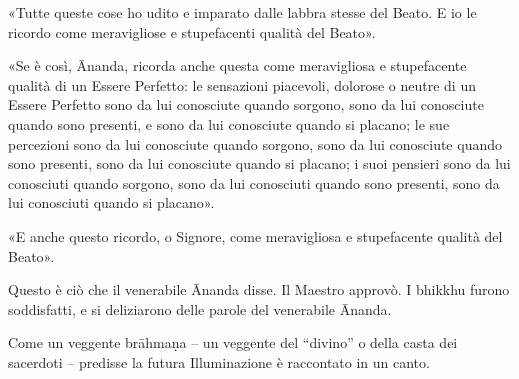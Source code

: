 «Tutte queste cose ho udito e imparato dalle labbra stesse del Beato. E
io le ricordo come meravigliose e stupefacenti qualità del Beato».


«Se è così, Ānanda, ricorda anche questa come meravigliosa e
stupefacente qualità di un Essere Perfetto: le sensazioni piacevoli,
dolorose o neutre di un Essere Perfetto sono da lui conosciute quando
sorgono, sono da lui conosciute quando sono presenti, e sono da lui
conosciute quando si placano; le sue percezioni sono da lui conosciute
quando sorgono, sono da lui conosciute quando sono presenti, sono da lui
conosciute quando si placano; i suoi pensieri sono da lui conosciuti
quando sorgono, sono da lui conosciuti quando sono presenti, sono da lui
conosciuti quando si placano».


«E anche questo ricordo, o Signore, come meravigliosa e stupefacente
qualità del Beato».


Questo è ciò che il venerabile Ānanda disse. Il Maestro approvò. I
bhikkhu furono soddisfatti, e si deliziarono delle parole del venerabile
Ānanda.




 Come un veggente brāhmaṇa – un veggente del “divino” o
della casta dei sacerdoti – predisse la futura Illuminazione è
raccontato in un canto.


